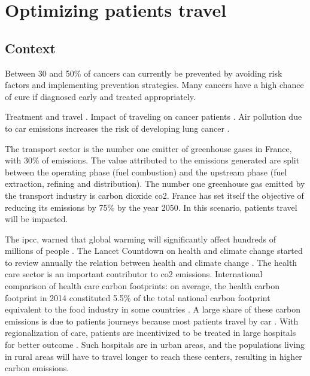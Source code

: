 \chapter{Optimizing patients travel}

\section{Context}

Between 30 and 50\% of cancers can currently be prevented by avoiding risk factors and implementing prevention strategies. Many cancers have a high chance of cure if diagnosed early and treated appropriately.

Treatment and travel \cite{weiss_global_2020,brundisini_chronic_2013,kelly_are_2016,salerno_understanding_2022}.
Impact of traveling on cancer patients \cite{payne_impact_2000,flytkjaer_virgilsen_cancer_2019,virgilsen_travel_2019,payne_impact_2000,ambroggi_distance_2015}.
Air pollution due to car emissions increases the risk of developing lung cancer \cite{raaschou-nielsen_air_2013}.

The transport sector is the number one emitter of greenhouse gases in France, with 30\% of emissions. The value attributed to the emissions generated are split between the operating phase (fuel combustion) and the upstream phase (fuel extraction, refining and distribution). The number one greenhouse gas emitted by the transport industry is carbon dioxide \ac{co2}.
France has set itself the objective of reducing its emissions by 75\% by the year 2050. In this scenario, patients travel will be impacted.

The \ac{ipcc}, warned that global warming will significantly affect hundreds of millions of people \cite{change_climate_2015}.
The Lancet Countdown on health and climate change started to review annually the relation between health and climate change \cite{watts_2020_2021}.
The health care sector is an important contributor to \ac{co2} emissions. International comparison of health care carbon footprints: on average, the health carbon footprint in 2014 constituted 5.5\% of the total national carbon footprint equivalent to the food industry in some countries \cite{pichler_international_2019}.
A large share of these carbon emissions is due to patients journeys \cite{andrews_carbon_2013,nicolet_what_2022} because most patients travel by car \cite{forner_carbon_2021}. With regionalization of care, patients are incentivized to be treated in large hospitals for better outcome \cite{eskander_health_2016}. Such hospitals are in urban areas, and the populations living in rural areas will have to travel longer to reach these centers, resulting in higher carbon emissions.

